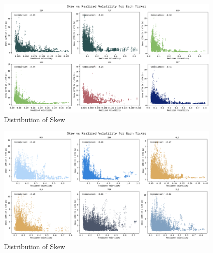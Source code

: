 \begin{figure}[H]
    \centering
    \includegraphics[width=1\textwidth]{images/skew_and_rv_otm_batch1.png}
    \caption{Distribution of Skew}
    \label{fig:skew_and_rv_otm_batch1}

    
\end{figure}
    \begin{figure}[H]
        \centering
        \includegraphics[width=1\textwidth]{images/skew_and_rv_otm_batch2.png}
        \caption{Distribution of Skew}
        \label{fig:skew_and_rv_otm_batch2}
    \end{figure}

